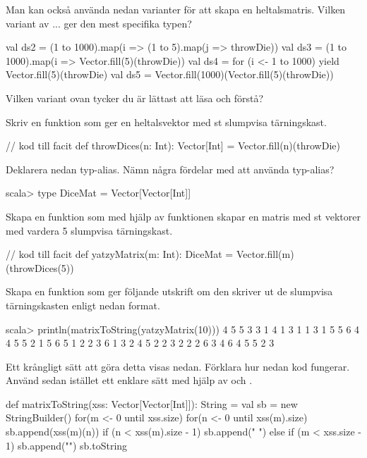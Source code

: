 \Subtask Man kan också använda nedan varianter för att skapa en heltalsmatris. Vilken variant av  ...  ger den mest specifika typen?  
\begin{REPL}
val ds2 = (1 to 1000).map(i => (1 to 5).map(j => throwDie))  
val ds3 = (1 to 1000).map(i => Vector.fill(5)(throwDie)) 
val ds4 = for (i <- 1 to 1000) yield Vector.fill(5)(throwDie) 
val ds5 = Vector.fill(1000)(Vector.fill(5)(throwDie))
\end{REPL}

\Subtask\Pen Vilken variant ovan tycker du är lättast att läsa och förstå?

\Subtask Skriv en funktion  som ger en heltalsvektor med  st slumpvisa tärningskast. 
\begin{Code}
// kod till facit
def throwDices(n: Int): Vector[Int] = Vector.fill(n)(throwDie)
\end{Code}

\Subtask Deklarera nedan typ-alias. Nämn några fördelar med att använda typ-alias?
\begin{REPL}
scala> type DiceMat = Vector[Vector[Int]]
\end{REPL}
{\color{red}{TODO: Till facit: (1) Slipper skriva långa typer (2) kan lätt ändra typ senare genom att bara äåndra på ett ställe (3) Koden blir lättare att begripa då typnamnet kan hjälpa till att beskriva vad typen används till på samma sätt som en klass, men man behöver inte skapa en klass -- det kan göras senare om behov uppstår.}}


\Subtask Skapa en funktion  som med hjälp av funktionen  skapar en matris med  st vektorer med vardera 5 slumpvisa tärningskast.
\begin{Code}
// kod till facit
def yatzyMatrix(m: Int): DiceMat = Vector.fill(m)(throwDices(5))
\end{Code}

\Subtask Skapa en funktion  som ger följande utskrift om den skriver ut de slumpvisa tärningskasten enligt nedan format. 
\begin{REPL}
scala> println(matrixToString(yatzyMatrix(10)))
4 5 5 3 3
1 4 1 3 1
1 3 1 5 5
6 4 4 5 5
2 1 5 6 5
1 2 2 3 6
1 3 2 4 5
2 2 3 2 2
2 6 3 4 6
4 5 5 2 3

\end{REPL}
Ett krångligt sätt att göra detta visas nedan. Förklara hur nedan kod fungerar. Använd sedan istället ett enklare sätt med hjälp av  och .
\begin{REPL}
def matrixToString(xss: Vector[Vector[Int]]): String = {
  val sb = new StringBuilder()
  for(m <- 0 until xss.size) {
    for(n <- 0 until xss(m).size) { 
      sb.append(xss(m)(n))
      if (n < xss(m).size - 1) sb.append(" ") 
      else if (m < xss.size - 1) sb.append("\n")
    }
  }
  sb.toString
}
\end{REPL}

